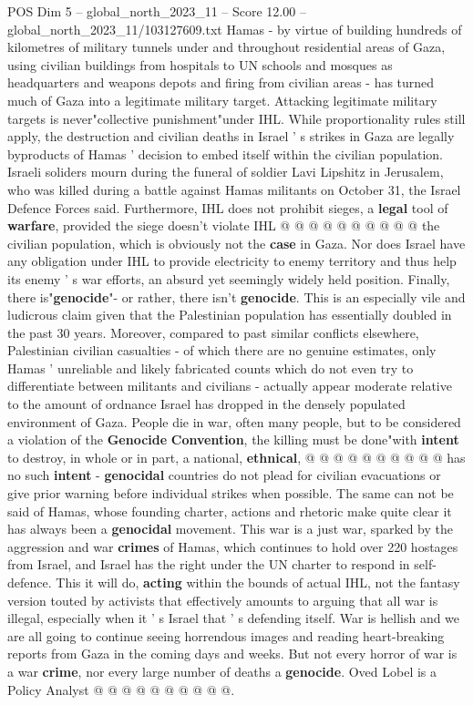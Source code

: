 \begin{textsample}{POS Dim 5 – global\_north\_2023\_11 – Score 12.00 – global\_north\_2023\_11/103127609.txt}
Hamas - by virtue of building hundreds of kilometres of military tunnels under and throughout residential areas of Gaza, using civilian buildings from hospitals to UN schools and mosques as headquarters and weapons depots and firing from civilian areas - has turned much of Gaza into a legitimate military target.
Attacking legitimate military targets is never"collective punishment"under IHL.
While proportionality rules still apply, the destruction and civilian deaths in Israel ' s strikes in Gaza are legally byproducts of Hamas ' decision to embed itself within the civilian population.
Israeli soliders mourn during the funeral of soldier Lavi Lipshitz in Jerusalem, who was killed during a battle against Hamas militants on October 31, the Israel Defence Forces said.
Furthermore, IHL does not prohibit sieges, a \textbf{legal} tool of \textbf{warfare}, provided the siege doesn't violate IHL @ @ @ @ @ @ @ @ @ @ the civilian population, which is obviously not the \textbf{case} in Gaza.
Nor does Israel have any obligation under IHL to provide electricity to enemy territory and thus help its enemy ' s war efforts, an absurd yet seemingly widely held position.
Finally, there is"\textbf{genocide}"- or rather, there isn't \textbf{genocide}.
This is an especially vile and ludicrous claim given that the Palestinian population has essentially doubled in the past 30 years.
Moreover, compared to past similar conflicts elsewhere, Palestinian civilian casualties - of which there are no genuine estimates, only Hamas ' unreliable and likely fabricated counts which do not even try to differentiate between militants and civilians - actually appear moderate relative to the amount of ordnance Israel has dropped in the densely populated environment of Gaza.
People die in war, often many people, but to be considered a violation of the \textbf{Genocide} \textbf{Convention}, the killing must be done"with \textbf{intent} to destroy, in whole or in part, a national, \textbf{ethnical}, @ @ @ @ @ @ @ @ @ @ has no such \textbf{intent} - \textbf{genocidal} countries do not plead for civilian evacuations or give prior warning before individual strikes when possible.
The same can not be said of Hamas, whose founding charter, actions and rhetoric make quite clear it has always been a \textbf{genocidal} movement.
This war is a just war, sparked by the aggression and war \textbf{crimes} of Hamas, which continues to hold over 220 hostages from Israel, and Israel has the right under the UN charter to respond in self-defence.
This it will do, \textbf{acting} within the bounds of actual IHL, not the fantasy version touted by activists that effectively amounts to arguing that all war is illegal, especially when it ' s Israel that ' s defending itself.
War is hellish and we are all going to continue seeing horrendous images and reading heart-breaking reports from Gaza in the coming days and weeks.
But not every horror of war is a war \textbf{crime}, nor every large number of deaths a \textbf{genocide}.
Oved Lobel is a Policy Analyst @ @ @ @ @ @ @ @ @ @.

\end{textsample}
